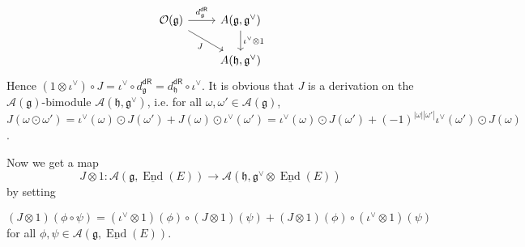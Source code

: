 \documentclass[12pt]{amsart}
\theoremstyle{definition}
\theoremstyle{remark}
\numberwithin{equation}{section}
\newcommand{\CA}{{\mathcal A}}
\newcommand{\CO}{{\mathcal O}}
\newcommand{\1}{{\mathbb{1}}}
\newcommand{\g}{\mathfrak{g}}
\newcommand{\h}{\mathfrak{h}}
\newcommand{\dr}{\mathsf{dR}}
\newcommand{\End}{\operatorname{End}}
\begin{document}
\[\begin{tikzcd}
	{\CO(\g)} & {A(\g, \g^{\vee})} \\
	& {A(\h, \g^{\vee})}
	\arrow["{d_{\g}^{\dr}}", from=1-1, to=1-2]
	\arrow["J"', from=1-1, to=2-2]
	\arrow["{\iota^{\vee} \otimes 1}", from=1-2, to=2-2]
\end{tikzcd}\]
Hence $(1\otimes \iota^{\vee}) \circ J = \iota^{\vee} \circ d_{\g}^{\dr} = d_{\h}^{\dr} \circ \iota^{\vee}$.
It is obvious that $J$ is a derivation on the $\CA(\g)$-bimodule $\CA(\h, \g^{\vee})$, i.e. for all $\omega, \omega' \in \CA(\g)$,
$J(\omega \odot \omega') = \iota^{\vee}(\omega) \odot J(\omega') + J(\omega) \odot \iota^{\vee}(\omega') = \iota^{\vee}(\omega) \odot J(\omega') +  (-1)^{|\omega||\omega'|} \iota^{\vee}(\omega')\odot J(\omega)$. 

Now we get a map
\begin{equation}
    J\otimes 1: \CA(\g, \underline{\End}(E)) \to \CA(\h, \g^{\vee} \otimes \underline{\End}(E))
\end{equation}
by setting

\begin{equation}
    (J\otimes 1)(\phi \circ \psi) = (\iota^{\vee} \otimes 1)(\phi) \circ (J\otimes 1)(\psi) + (J\otimes 1)(\phi) \circ (\iota^{\vee} \otimes 1)(\psi)
\end{equation}
for all $\phi, \psi \in \CA(\g, \underline{\End}(E))$.
\end{document}
